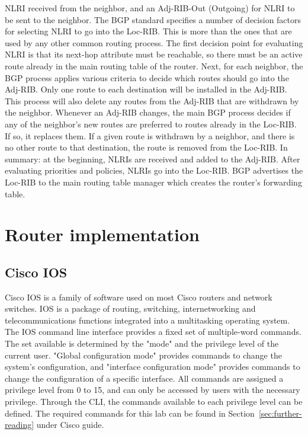 \documentclass[a4paper]{article}
\begin{document}
NLRI received from the neighbor, and an Adj-RIB-Out (Outgoing) for NLRI to be sent to the neighbor.
The BGP standard specifies a number of decision factors for selecting NLRI to go into the Loc-RIB. This is more than
the ones that are used by any other common routing process. The first decision point for evaluating NLRI is that its
next-hop attribute must be reachable, so there must be an active route already in the main routing table of the router.
Next, for each neighbor, the BGP process applies various criteria to decide which routes should go into the Adj-RIB.
Only one route to each destination will be installed in the Adj-RIB. This process will also delete any routes from the
Adj-RIB that are withdrawn by the neighbor.
Whenever an Adj-RIB changes, the main BGP process decides if any of the neighbor's new routes are preferred to routes
already in the Loc-RIB. If so, it replaces them. If a given route is withdrawn by a neighbor, and there is no other
route to that destination, the route is removed from the Loc-RIB.
In summary: at the beginning, NLRIs are received and added to the Adj-RIB. After evaluating priorities and policies,
NLRIs go into the Loc-RIB. BGP advertises the Loc-RIB to the main routing table manager which creates the router's
forwarding table.

\section{Router implementation}

\subsection{Cisco IOS}

Cisco IOS is a family of software used on most Cisco routers and network switches. IOS is a package of routing,
switching, internetworking and telecommunications functions integrated into a multitasking operating system. The IOS
command line interface provides a fixed set of multiple-word commands. The set available is determined by the "mode"
and the privilege level of the current user. "Global configuration mode" provides commands to change the system's
configuration, and "interface configuration mode" provides commands to change the configuration of a specific
interface. All commands are assigned a privilege level from 0 to 15, and can only be accessed by users with the
necessary privilege. Through the CLI, the commands available to each privilege level can be defined.
The required commands for this lab can be found in Section~\ref{sec:further-reading} under Cisco guide.
\end{document}

